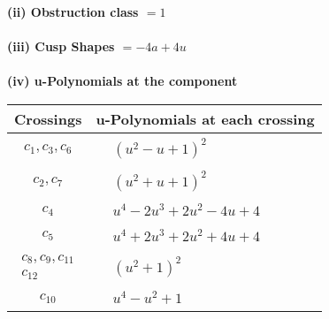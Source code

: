 \documentclass[1p]{elsarticle_modified}
\theoremstyle{definition}
\begin{document}
\flushleft \textbf{(ii) Obstruction class $= 1$}\\~\\
\flushleft \textbf{(iii) Cusp Shapes $= -4 a+4 u$}\\~\\
\newpage\renewcommand{\arraystretch}{1}
\flushleft \textbf{(iv) u-Polynomials at the component}\newline \\
\begin{tabular}{m{50pt}|m{274pt}}
Crossings & \hspace{64pt}u-Polynomials at each crossing \\
\hline $$\begin{aligned}c_{1},c_{3},c_{6}\end{aligned}$$&$\begin{aligned}
&(u^2- u+1)^2
\end{aligned}$\\
\hline $$\begin{aligned}c_{2},c_{7}\end{aligned}$$&$\begin{aligned}
&(u^2+u+1)^2
\end{aligned}$\\
\hline $$\begin{aligned}c_{4}\end{aligned}$$&$\begin{aligned}
&u^4-2 u^3+2 u^2-4 u+4
\end{aligned}$\\
\hline $$\begin{aligned}c_{5}\end{aligned}$$&$\begin{aligned}
&u^4+2 u^3+2 u^2+4 u+4
\end{aligned}$\\
\hline $$\begin{aligned}c_{8},c_{9},c_{11}\\c_{12}\end{aligned}$$&$\begin{aligned}
&(u^2+1)^2
\end{aligned}$\\
\hline $$\begin{aligned}c_{10}\end{aligned}$$&$\begin{aligned}
&u^4- u^2+1
\end{aligned}$\\
\hline
\end{tabular}\\~\\
\end{document}
